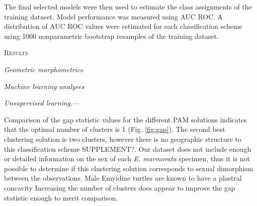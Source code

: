 \documentclass[12pt,letterpaper]{article}\usepackage{graphicx, color}
\renewcommand{\section}[1]{%
\bigskip
\begin{center}
\begin{Large}
\normalfont\scshape #1
\medskip
\end{Large}
\end{center}}
\renewcommand{\subsection}[1]{%
\bigskip
\begin{center}
\begin{large}
\normalfont\itshape #1
\end{large}
\end{center}}
\renewcommand{\subsubsection}[1]{%
\vspace{2ex}
\noindent
\textit{#1.}---}
\begin{document}
The final selected models were then used to estimate the class assignments of the training dataset. Model performance was measured using AUC ROC. A distribution of AUC ROC values were estimated for each classification scheme using 1000 nonparametric bootstrap resamples of the training dataset.

\section{Results}
\subsection{Geometric morphometrics}

\subsection{Machine learning analyses}
\subsubsection{Unsupervised learning}

Comparison of the gap statistic values for the different PAM solutions indicates that the optimal number of clusters is 1 (Fig. \ref{fig:gap}). The second best clustering solution is two clusters, however there is no geographic structure to this classification scheme SUPPLEMENT?. Our dataset does not include enough or detailed information on the sex of each \textit{E. marmorata} specimen, thus it is not possible to determine if this clustering solution corresponds to sexual dimorphism between the observations. Male Emyidine turtles are known to have a plastral concavity
Increasing the number of clusters does appear to improve the gap statistic enough to merit comparison. 
\end{document}

